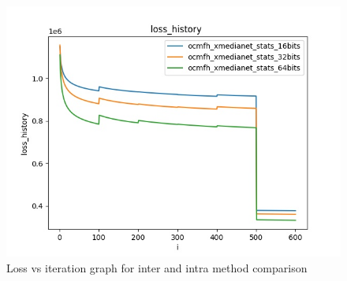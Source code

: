 \begin{figure}[H]
\begin{minipage}[!h]{0.6\linewidth}
                \vspace{0.1ex}
                \hspace{0.1ex}
            \end{minipage}
            \begin{minipage}[!h]{0.7\linewidth}
                \centering
                \includegraphics[width=\linewidth]{resultsImages/lossHistory/loss_history_ocmfh_xmedianet_bits.jpeg}
                \vspace{0.1ex}
                \hspace{1ex}
            \end{minipage}
            \caption{Loss vs iteration graph for inter and intra method comparison}
        \label{fig:}
        \end{figure}
        \FloatBarrier
